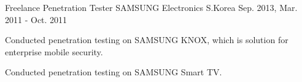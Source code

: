 \begin{cventries}
  \cventry
    {Freelance Penetration Tester} %
    {SAMSUNG Electronics} %
    {S.Korea} %
    {Sep. 2013, Mar. 2011 - Oct. 2011} %
    {
      \begin{cvitems} %
        \item {Conducted penetration testing on SAMSUNG KNOX, which is solution for enterprise mobile security.}
        \item {Conducted penetration testing on SAMSUNG Smart TV.}
      \end{cvitems}
    }
    {}

\end{cventries}
